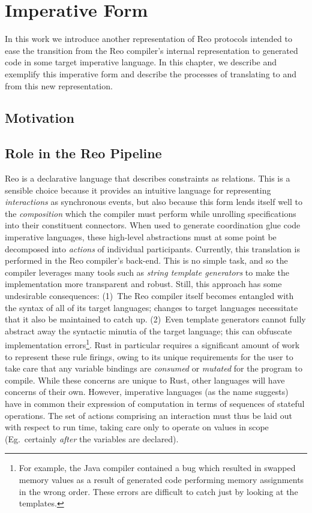 \chapter{Imperative Form}
\label{sec:imperative_form}
In this work we introduce another representation of Reo protocols intended to ease the transition from the Reo compiler's internal representation to generated code in some target imperative language. In this chapter, we describe and exemplify this imperative form and describe the processes of translating to and from this new representation. 


\section{Motivation}

\section{Role in the Reo Pipeline}
Reo is a declarative language that describes constraints as relations. This is a sensible choice because it provides an intuitive language for representing \textit{interactions} as synchronous events, but also because this form lends itself well to the \textit{composition} which the compiler must perform while unrolling specifications into their constituent connectors. When used to generate coordination glue code imperative languages, these high-level abstractions must at some point be decomposed into \textit{actions} of individual participants. Currently, this translation is performed in the Reo compiler's back-end. This is no simple task, and so the compiler leverages many tools such as \textit{string template generators} to make the implementation more transparent and robust. Still, this approach has some undesirable consequences: (1)~The Reo compiler itself becomes entangled with the syntax of all of its target languages; changes to target languages necessitate that it also be maintained to catch up. (2)~Even template generators cannot fully abstract away the syntactic minutia of the target language; this can obfuscate implementation errors\footnote{For example, the Java compiler contained a bug which resulted in swapped memory values as a result of generated code performing memory assignments in the wrong order. These errors are difficult to catch just by looking at the templates.}. Rust in particular requires a significant amount of work to represent these rule firings, owing to its unique requirements for the user to take care that any variable bindings are \textit{consumed} or \textit{mutated} for the program to compile. While these concerns are unique to Rust, other languages will have concerns of their own. However, imperative languages (as the name suggests) have in common their expression of computation in terms of sequences of stateful operations. The set of actions comprising an interaction must thus be laid out with respect to run time, taking care only to operate on values in scope (Eg.\ certainly \textit{after} the variables are declared). 

